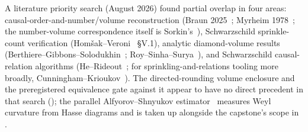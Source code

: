 A literature priority search (August 2026) found partial overlap in four
areas: causal-order-and-number/volume reconstruction (Braun
2025~\cite{braun2025}; Myrheim 1978~\cite{myrheim1978}; the number-volume
correspondence itself is Sorkin's~\cite{sorkin1997forks}), Schwarzschild
sprinkle-count verification (Hom\v{s}ak--Veroni~\cite{homsakveroni2024}
\S V.1), analytic diamond-volume results
(Berthiere--Gibbons--Solodukhin~\cite{berthiere2016};
Roy--Sinha--Surya~\cite{roysinhasurya2013}), and Schwarzschild
causal-relation algorithms (He--Rideout~\cite{herideout2009}; for
sprinkling-and-relations tooling more broadly,
Cunningham--Krioukov~\cite{cunninghamkrioukov2018}). The directed-rounding
volume enclosure and the preregistered equivalence gate against it appear to
have no direct precedent in that search (); the parallel
Alfyorov--Shnyukov
estimator~\cite{alfyorov2026weyl} measures Weyl curvature from Hasse
diagrams and is taken up alongside the capstone's scope in
.
